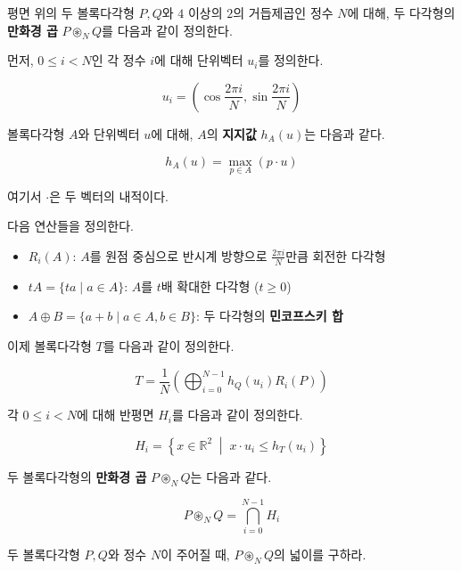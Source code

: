 
평면 위의 두 볼록다각형 $P,Q$와 $4$ 이상의 $2$의 거듭제곱인 정수 $N$에 대해, 두 다각형의 \textbf{만화경 곱} $P\circledast_N Q$를 다음과 같이 정의한다.

먼저, $0\le i<N$인 각 정수 $i$에 대해 단위벡터 $u_i$를 정의한다.

$$u_i=\left(\cos\frac{2\pi i}{N},\sin\frac{2\pi i}{N}\right)$$

볼록다각형 $A$와 단위벡터 $u$에 대해, $A$의 \textbf{지지값} $h_A(u)$는 다음과 같다.

$$h_A(u)=\max_{p\in A}(p\cdot u)$$

여기서 $\cdot$은 두 벡터의 내적이다.

다음 연산들을 정의한다.

\begin{itemize}
\item $R_i(A)$: $A$를 원점 중심으로 반시계 방향으로 $\frac{2\pi i}{N}$만큼 회전한 다각형
\item $tA=\{ta\mid a\in A\}$: $A$를 $t$배 확대한 다각형 ($t\ge 0$)
\item $A\oplus B=\{a+b\mid a\in A,b\in B\}$: 두 다각형의 \textbf{민코프스키 합}
\end{itemize}

이제 볼록다각형 $T$를 다음과 같이 정의한다.

$$T=\frac{1}{N}\left(\bigoplus_{i=0}^{N-1}h_Q(u_i)R_i(P)\right)$$

각 $0\le i<N$에 대해 반평면 $H_i$를 다음과 같이 정의한다.

$$H_i=\left\{x\in\mathbb{R}^2\;\middle|\;x\cdot u_i\le h_T(u_i)\right\}$$

두 볼록다각형의 \textbf{만화경 곱} $P\circledast_N Q$는 다음과 같다.

$$P\circledast_N Q=\bigcap_{i=0}^{N-1}H_i$$

두 볼록다각형 $P,Q$와 정수 $N$이 주어질 때, $P\circledast_N Q$의 넓이를 구하라.
